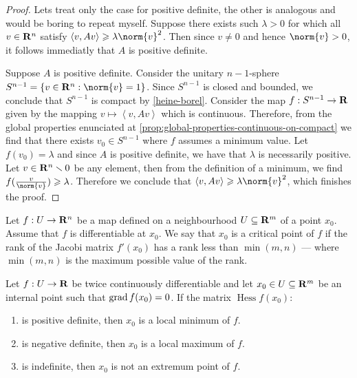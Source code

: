 \begin{proof}
  Lets treat only the case for positive definite, the other is analogous and
  would be boring to repeat myself. Suppose there exists such \(\lambda > 0\) for
  which all \(v \in \mathbf{R}^n\) satisfy \(\left\langle v, Av \right\rangle \geq \lambda \norm{v}^2\). Then
  since \(v \neq 0\) and hence \(\norm{v} > 0\), it follows immediatly that \(A\)
  is positive definite.

  Suppose \(A\) is positive definite. Consider the unitary \(n-1\)-sphere
  \(S^{n-1} = \{v \in \R^{n} : \norm{v} = 1\}\). Since \(S^{n-1}\) is closed and
  bounded, we conclude that \(S^{n-1}\) is compact by
  \cref{heine-borel}. Consider the map \(f: S^{n-1} \to \mathbf{R}\) given by the mapping
  \(v \mapsto \left\langle v, Av \right\rangle\) which is continuous. Therefore, from the global
  properties enunciated at \cref{prop:global-properties-continuous-on-compact}
  we find that there exists \(v_0 \in S^{n-1}\) where \(f\) assumes a minimum
  value. Let \(f(v_0) = \lambda\) and since \(A\) is positive definite, we have that
  \(\lambda\) is necessarily positive. Let \(v \in \mathbf{R}^n \smallsetminus 0\) be any element, then from
  the definition of a minimum, we find \(f(\frac{v}{\norm{v}}) \geq \lambda\). Therefore
  we conclude that \(\left\langle v, Av \right\rangle \geq \lambda \norm{v}^2\), which finishes the
  proof.
\end{proof}

\begin{definition}
  \label{def:critical-point}
  Let \(f: U \to \mathbf{R}^n\) be a map defined on a neighbourhood \(U \subseteq \mathbf{R}^m\) of a
  point \(x_0\). Assume that \(f\) is differentiable at \(x_0\). We say that
  \(x_0\) is a critical point of \(f\) if the rank of the Jacobi matrix
  \(f'(x_0)\) has a rank less than \(\min(m, n)\) --- where \(\min(m, n)\) is the
  maximum possible value of the rank.
\end{definition}

\begin{theorem}
  \label{thm:classification-critical-points}
  Let \(f: U \to \mathbf{R}\) be twice continuously differentiable and let \(x_0 \in U \subseteq
  \mathbf{R}^m\) be an internal point such that \(\operatorname{grad} f(x_0) = 0\). If
  the matrix \(\operatorname{Hess} f(x_0)\):
  \begin{enumerate}\setlength\itemsep{0em}
    \item is positive definite, then \(x_0\) is a local
      minimum of \(f\).
    \item is negative definite, then \(x_{0}\) is a local
      maximum of \(f\).
    \item is indefinite, then \(x_0\) is not an extremum point of \(f\).
  \end{enumerate}
\end{theorem}


